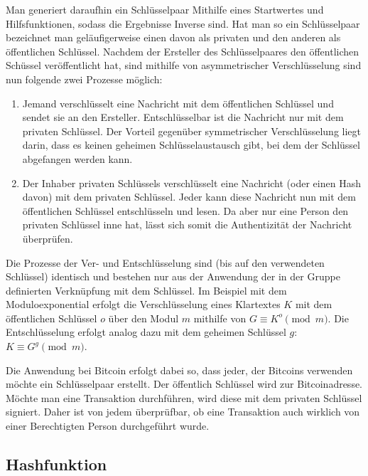 Man generiert daraufhin ein Schlüsselpaar Mithilfe eines Startwertes und Hilfsfunktionen, sodass die Ergebnisse Inverse sind.
Hat man so ein Schlüsselpaar bezeichnet man geläufigerweise einen davon als privaten und den anderen als öffentlichen Schlüssel.
Nachdem der Ersteller des Schlüsselpaares den öffentlichen Schüssel veröffentlicht hat, sind mithilfe von asymmetrischer Verschlüsselung sind nun folgende zwei Prozesse möglich:
\begin{enumerate}
    \item Jemand verschlüsselt eine Nachricht mit dem öffentlichen Schlüssel und sendet sie an den Ersteller.
    Entschlüsselbar ist die Nachricht nur mit dem privaten Schlüssel.
    Der Vorteil gegenüber symmetrischer Verschlüsselung liegt darin, dass es keinen geheimen Schlüsselaustausch gibt, bei dem der Schlüssel abgefangen werden kann.
    \item Der Inhaber privaten Schlüssels verschlüsselt eine Nachricht (oder einen Hash davon) mit dem privaten Schlüssel.
    Jeder kann diese Nachricht nun mit dem öffentlichen Schlüssel entschlüsseln und lesen.
    Da aber nur eine Person den privaten Schlüssel inne hat, lässt sich somit die Authentizität der Nachricht überprüfen.
\end{enumerate}

Die Prozesse der Ver- und Entschlüsselung sind (bis auf den verwendeten Schlüssel) identisch und bestehen nur aus der Anwendung der in der Gruppe definierten Verknüpfung mit dem Schlüssel.
Im Beispiel mit dem Moduloexponential erfolgt die Verschlüsselung eines Klartextes $K$ mit dem öffentlichen Schlüssel $o$ über den Modul $m$ mithilfe von $G \equiv K^o \pmod{m}$.
Die Entschlüsselung erfolgt analog dazu mit dem geheimen Schlüssel $g$: $K \equiv G^g \pmod{m}$.

Die Anwendung bei Bitcoin erfolgt dabei so, dass jeder, der Bitcoins verwenden möchte ein Schlüsselpaar erstellt.
Der öffentlich Schlüssel wird zur Bitcoinadresse.
Möchte man eine Transaktion durchführen, wird diese mit dem privaten Schlüssel signiert.
Daher ist von jedem überprüfbar, ob eine Transaktion auch wirklich von einer Berechtigten Person durchgeführt wurde.

\subsection{Hashfunktion}

